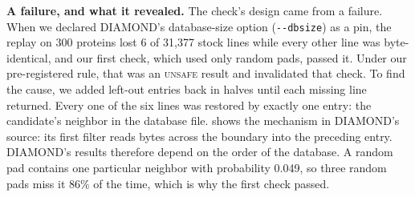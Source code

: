 \documentclass[letterpaper,twocolumn,10pt]{article}
\theoremstyle{definition}
\newcommand{\dec}[1]{\textsc{#1}}
\begin{document}
\textbf{A failure, and what it revealed.} The check's design came from a failure. When we declared DIAMOND's database\nobreakdash-size
option (\texttt{-{}-dbsize}) as a pin, the replay on 300 proteins lost 6 of 31{,}377 stock lines while every other line
was byte\nobreakdash-identical, and our first check, which used only random pads, passed it. Under our pre\nobreakdash-registered rule, that was
an \dec{unsafe} result and invalidated that check. To find the cause, we added left\nobreakdash-out entries back in halves until each
missing line returned. Every one of the six lines was restored by exactly one entry: the candidate's neighbor in the
database file.  shows the mechanism in DIAMOND's source: its first filter reads bytes across the
boundary into the preceding entry. DIAMOND's results therefore depend on the order of the database. A random pad contains one particular neighbor with probability 0.049, so three random pads miss it
86\% of the time, which is why the first check passed.
\end{document}
